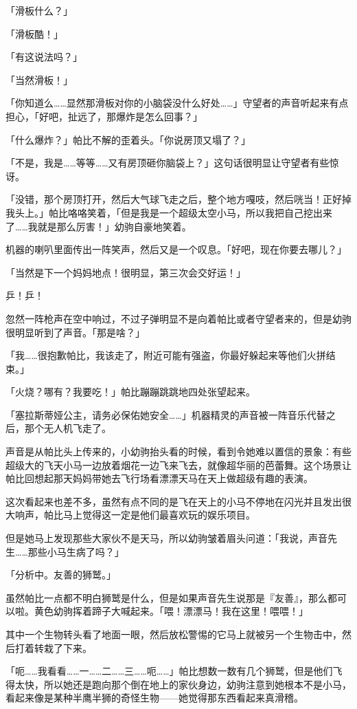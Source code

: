 「滑板什么？」

「滑板酷！」

「有这说法吗？」

「当然滑板！」

「你知道么……显然那滑板对你的小脑袋没什么好处……」守望者的声音听起来有点担心，「好吧，扯远了，那爆炸是怎么回事？」

「什么爆炸？」帕比不解的歪着头。「你说房顶又塌了？」

「不是，我是……等等……又有房顶砸你脑袋上？」这句话很明显让守望者有些惊讶。

「没错，那个房顶打开，然后大气球飞走之后，整个地方嘎吱，然后咣当！正好掉我头上。」帕比咯咯笑着，「但是我是一个超级太空小马，所以我把自己挖出来了……我就是那么厉害！」幼驹自豪地笑着。

机器的喇叭里面传出一阵笑声，然后又是一个叹息。「好吧，现在你要去哪儿？」

「当然是下一个妈妈地点！很明显，第三次会交好运！」

乒！乒！

忽然一阵枪声在空中响过，不过子弹明显不是向着帕比或者守望者来的，但是幼驹很明显听到了声音。「那是啥？」

「我……很抱歉帕比，我该走了，附近可能有强盗，你最好躲起来等他们火拼结束。」

「火烧？哪有？我要吃！」帕比蹦蹦跳跳地四处张望起来。

「塞拉斯蒂娅公主，请务必保佑她安全……」机器精灵的声音被一阵音乐代替之后，那个无人机飞走了。

声音是从帕比头上传来的，小幼驹抬头看的时候，看到令她难以置信的景象：有些超级大的飞天小马一边放着烟花一边飞来飞去，就像超华丽的芭蕾舞。这个场景让帕比回想起那天妈妈带她去飞行场看漂漂天马在天上做超级有趣的表演。

这次看起来也差不多，虽然有点不同的是飞在天上的小马不停地在闪光并且发出很大响声，帕比马上觉得这一定是他们最喜欢玩的娱乐项目。

但是她马上发现那些大家伙不是天马，所以幼驹皱着眉头问道：「我说，声音先生……那些小马生病了吗？」

「{\mtzh 分析中。友善的狮鹫。}」

虽然帕比一点都不明白狮鹫是什么，但是如果声音先生说那是『友善』，那么都可以啦。黄色幼驹挥着蹄子大喊起来。「喂！漂漂马！我在这里！喂喂！」

其中一个生物转头看了地面一眼，然后放松警惕的它马上就被另一个生物击中，然后打着转栽了下来。

「呃……我看看……一……二……三……呃……」帕比想数一数有几个狮鹫，但是他们飞得太快，所以她还是跑向那个倒在地上的家伙身边，幼驹注意到她根本不是小马，看起来像是某种半鹰半狮的奇怪生物——她觉得那东西看起来真滑稽。

